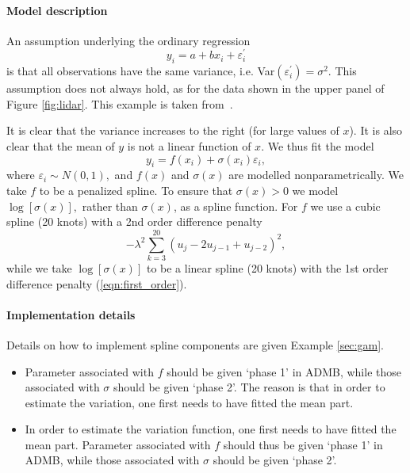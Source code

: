 \documentclass[12pt,letter,reqno]{book}
\begin{document}
\paragraph{Model description}
An assumption underlying the ordinary regression 
\[
y_{i}=a+bx_{i}+\varepsilon _{i}^{\prime }
\]%
is that all observations have the same variance, 
i.e. Var$\left( \varepsilon_{i}^{\prime }\right) =\sigma^{2}$. 
This assumption does not always hold,
as for the data shown in the upper panel of Figure \ref{fig:lidar}. 
This example is taken from~.

It is clear that the variance increases to the right (for large values of $x$). It is also clear
that the mean of $y$ is not a linear function of $x$. We thus fit the model%
\[
y_{i}=f(x_{i})+\sigma (x_{i})\varepsilon _{i},
\]%
where $\varepsilon _{i}\sim N(0,1),$ and $f(x)$ and $\sigma (x)$ are
modelled nonparametrically. We take $f$ to be a
penalized spline. To ensure that $\sigma (x)>0$ we model $\log \left[ \sigma
(x)\right] ,$ rather than $\sigma (x)$, as a spline function. For $f$ we use
a cubic spline (20 knots) with a 2nd order difference penalty%
\[
-\lambda ^{2}\sum_{k=3}^{20}\left( u_{j}-2u_{j-1}+u_{j-2}\right) ^{2},
\]%
while we take $\log \left[ \sigma (x)\right] $ to be a linear spline (20
knots) with the 1st order difference penalty (\ref{eqn:first_order}).

\paragraph{Implementation details}
Details on how to implement spline components are given Example \ref{sec:gam}.

\begin{itemize}
\item Parameter associated with $f$ should be given `phase 1' in ADMB, while
those associated with $\sigma $ should be given `phase 2'. The reason is
that in order to estimate the variation, one first needs to have fitted the
mean part. 
\end{itemize}

\begin{itemize}
  \item In order to estimate the variation function, one first needs to have
  fitted the mean part. Parameter associated with $f$ should thus be given
  `phase 1' in ADMB, while those associated with $\sigma$ should be given `phase
  2'.
\end{itemize}
\end{document}
